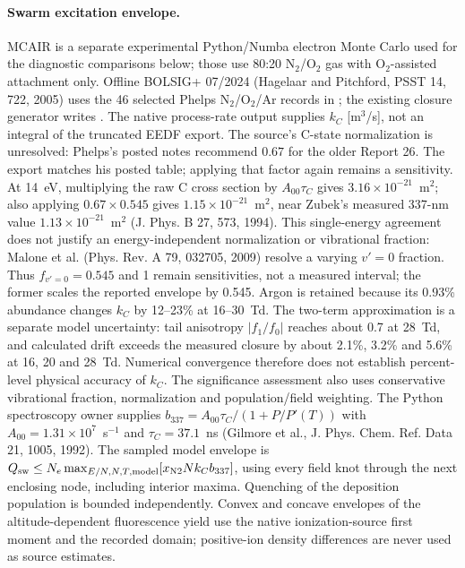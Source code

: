 \documentclass[11pt]{article}
\begin{document}
\paragraph{Swarm excitation envelope.} MCAIR is a separate experimental
Python/Numba electron Monte Carlo used for the diagnostic comparisons below;
those use 80:20 N$_2$/O$_2$ gas with O$_2$-assisted attachment only.
Offline BOLSIG+ 07/2024 (Hagelaar and Pitchford, PSST 14, 722, 2005) uses the
46 selected Phelps N$_2$/O$_2$/Ar records in
; the existing closure generator
writes .
The native process-rate output supplies $k_C$ [m$^3$/s], not an integral of
the truncated EEDF export. The source's C-state normalization is unresolved:
Phelps's posted notes recommend $0.67$ for the older Report 26. The export
matches his posted table; applying that factor again remains a sensitivity.
At 14~eV, multiplying the raw C cross section by $A_{00}\tau_C$
gives $3.16\times10^{-21}$~m$^2$; also applying $0.67\times0.545$ gives
$1.15\times10^{-21}$~m$^2$, near Zubek's measured 337-nm value
$1.13\times10^{-21}$~m$^2$ (J. Phys. B 27, 573, 1994). This single-energy
agreement does not justify an energy-independent normalization or vibrational
fraction: Malone et al. (Phys. Rev. A 79, 032705, 2009) resolve a varying
$v'=0$ fraction. Thus $f_{v'=0}=0.545$ and 1 remain sensitivities, not a
measured interval; the former scales the reported envelope by 0.545. Argon is retained because its
0.93\% abundance changes $k_C$ by 12--23\% at 16--30~Td.
The two-term approximation is a separate model uncertainty: tail anisotropy
$|f_1/f_0|$ reaches about 0.7 at 28~Td, and calculated drift exceeds the
measured closure by about 2.1\%, 3.2\% and 5.6\% at 16, 20 and 28~Td.
Numerical convergence therefore does not establish percent-level physical
accuracy of $k_C$. The significance assessment also uses conservative
vibrational fraction, normalization and population/field weighting.
The Python spectroscopy owner supplies
$b_{337}=A_{00}\tau_C/(1+P/P'(T))$ with
$A_{00}=1.31\times10^7$~s$^{-1}$ and $\tau_C=37.1$~ns
(Gilmore et al., J. Phys. Chem. Ref. Data 21, 1005, 1992).
The sampled model envelope is
$Q_{\rm sw}\le N_e\max_{E/N,N,T,\mathrm{model}}[x_{\rm N2}N k_C b_{337}]$,
using every field knot through the next enclosing node, including interior
maxima. Quenching of the deposition population is bounded independently.
Convex and concave envelopes of the altitude-dependent fluorescence yield
use the native ionization-source first moment and the recorded domain;
positive-ion density differences are never used as source estimates.
\end{document}
